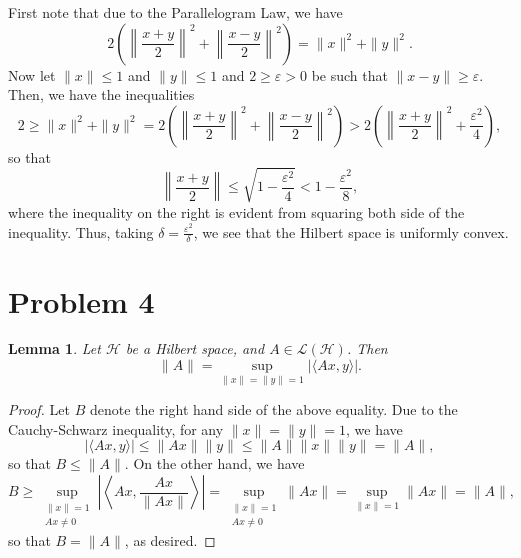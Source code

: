 \documentclass[11pt]{article}
\theoremstyle{thmstyle}
\newtheorem{lemma}[theorem]{Lemma}
\theoremstyle{defstyle}
\renewcommand{\le}{\leqslant}
\renewcommand{\ge}{\geqslant}
\newcommand{\calL}{\mathcal{L}}
\newcommand{\calH}{\mathcal{H}}
\begin{document}
First note that due to the Parallelogram Law, we have 
\begin{equation*}
    2\left(\left\|\frac{x + y}{2}\right\|^2 + \left\|\frac{x - y}{2}\right\|^2\right) = \|x\|^2 + \|y\|^2.
\end{equation*}
Now let $\|x\|\le 1$ and $\|y\|\le 1$ and $2 \ge \varepsilon > 0$ be such that $\|x - y\|\ge\varepsilon$. Then, we have the inequalities
\begin{equation*}
    2\ge\|x\|^2 + \|y\|^2 = 2\left(\left\|\frac{x + y}{2}\right\|^2 + \left\|\frac{x - y}{2}\right\|^2\right) > 2\left(\left\|\frac{x + y}{2}\right\|^2 + \frac{\varepsilon^2}{4}\right),
\end{equation*}
so that 
\begin{equation*}
    \left\|\frac{x + y}{2}\right\|\le\sqrt{1 - \frac{\varepsilon^2}{4}} < 1 - \frac{\varepsilon^2}{8},
\end{equation*}
where the inequality on the right is evident from squaring both side of the inequality. Thus, taking $\delta = \frac{\varepsilon^2}{\delta}$, we see that the Hilbert space is uniformly convex.

\section{Problem 4}

\begin{lemma}
    Let $\calH$ be a Hilbert space, and $A\in\calL(\calH)$. Then 
    \begin{equation*}
        \|A\| = \sup_{\|x\| = \|y\| = 1}|\langle Ax, y\rangle|.
    \end{equation*}
\end{lemma}
\begin{proof}
    Let $B$ denote the right hand side of the above equality. Due to the Cauchy-Schwarz inequality, for any $\|x\| = \|y\| = 1$, we have 
    \begin{equation*}
        |\langle Ax, y\rangle|\le \|Ax\|\|y\|\le \|A\|\|x\|\|y\| = \|A\|,
    \end{equation*}
    so that $B\le \|A\|$. On the other hand, we have 
    \begin{equation*}
        B\ge\sup_{\substack{\|x\| = 1\\ Ax\ne 0}}\left|\left\langle Ax, \frac{Ax}{\|Ax\|}\right\rangle\right| = \sup_{\substack{\|x\| = 1\\ Ax\ne 0}}\|Ax\| = \sup_{\|x\| = 1}\|Ax\| = \|A\|,
    \end{equation*}
    so that $B = \|A\|$, as desired.
\end{proof}
\end{document}
